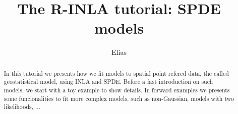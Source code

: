 \documentclass[a4paper,11pt]{report}
\title{The R-INLA tutorial: SPDE models}
\author{Elias}
\begin{document}
\maketitle

\begin{abstract}
  In this tutorial we presents how we fit models 
  to spatial point refered data, the called 
  geostatistical model, using INLA and SPDE. 
  Before a fast introduction on such models, 
  we start with a toy example to show details. 
  In forward examples we presents some funcionalities 
  to fit more complex models, such as  non-Gaussian,  
  models with two likelihoods, ... 
\end{abstract} 

\tableofcontents









\end{document}
